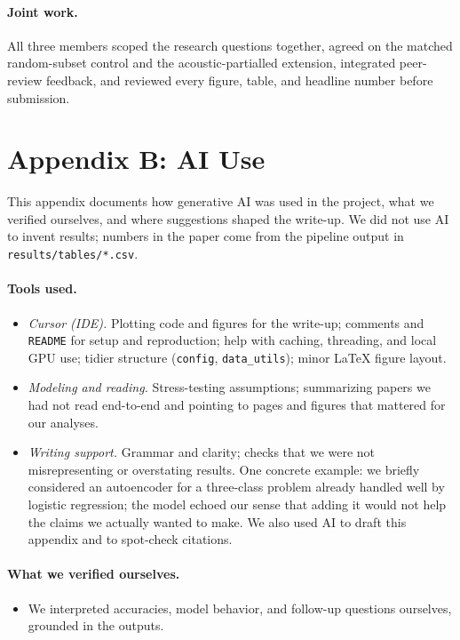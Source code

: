 \documentclass[11pt]{article}
\begin{document}
\paragraph{Joint work.}
All three members scoped the research questions together, agreed on the matched random-subset control and the acoustic-partialled extension, integrated peer-review feedback, and reviewed every figure, table, and headline number before submission.

\section*{Appendix B: AI Use}

\sloppy
This appendix documents how generative AI was used in the project, what we verified ourselves, and where suggestions shaped the write-up. We did not use AI to invent results; numbers in the paper come from the pipeline output in \texttt{results/tables/*.csv}.

\paragraph{Tools used.}
\begin{itemize}
\setlength{\itemsep}{1pt}
    \item \emph{Cursor (IDE).} Plotting code and figures for the write-up; comments and \texttt{README} for setup and reproduction; help with caching, threading, and local GPU use; tidier structure (\texttt{config}, \texttt{data\_utils}); minor LaTeX figure layout.
    \item \emph{Modeling and reading.} Stress-testing assumptions; summarizing papers we had not read end-to-end and pointing to pages and figures that mattered for our analyses.
    \item \emph{Writing support.} Grammar and clarity; checks that we were not misrepresenting or overstating results. One concrete example: we briefly considered an autoencoder for a three-class problem already handled well by logistic regression; the model echoed our sense that adding it would not help the claims we actually wanted to make. We also used AI to draft this appendix and to spot-check citations.
\end{itemize}

\paragraph{What we verified ourselves.}
\begin{itemize}
\setlength{\itemsep}{1pt}
    \item We interpreted accuracies, model behavior, and follow-up questions ourselves, grounded in the outputs.
\end{itemize}
\end{document}
